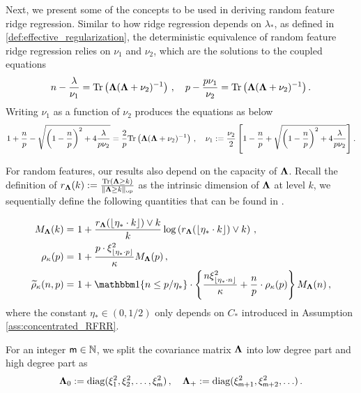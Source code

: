 Next, we present some of the concepts to be used in deriving random feature ridge regression. Similar to how ridge regression depends on \(\lambda_*\), as defined in \cref{def:effective_regularization}, the deterministic equivalence of random feature ridge regression relies on \(\nu_1\) and \(\nu_2\), which are the solutions to the coupled equations
\begin{equation}\label{eq:fixed_points_appendix}
    n - \frac{\lambda}{\nu_1} = {\rm Tr}\left( {\boldsymbol \Lambda} ( {\boldsymbol \Lambda} + \nu_2)^{-1} \right)\,, \quad p - \frac{p\nu_1}{\nu_2} = {\rm Tr} \left( {\boldsymbol \Lambda} ( {\boldsymbol \Lambda} + \nu_2 )^{-1} \right).
\end{equation}
Writing $\nu_1$ as a function of $\nu_2$ produces the equations as below
\begin{equation}\label{eq:def:nu}
    1 + \frac{n}{p} - \sqrt{\left(1 - \frac{n}{p}\right)^2 + 4\frac{\lambda}{p\nu_2}}  = \frac{2}{p} {\rm Tr} \left( {\boldsymbol \Lambda} ( {\boldsymbol \Lambda} + \nu_2 )^{-1} \right)\,, \quad \nu_1 := \frac{\nu_2}{2} \left[ 1 - \frac{n}{p} + \sqrt{\left(1 - \frac{n}{p}\right)^2 + 4\frac{\lambda}{p\nu_2}} \right].
\end{equation} 



For random features, our results also depend on the capacity of ${\boldsymbol \Lambda}$. Recall the definition of \(r_{\boldsymbol \Lambda}(k) := \frac{{\rm Tr}({\boldsymbol \Lambda}{\geq k})}{\| {\boldsymbol \Lambda}{\geq k} \|_{\rm op}}\) as the intrinsic dimension of \({\boldsymbol \Lambda}\) at level \(k\), we sequentially define the following quantities that can be found in \citet{misiakiewicz2024non,defilippis2024dimension}.

\begin{align}
    M_\bLambda (k) =&~ 1 + \frac{r_{\bLambda} (\lfloor \eta_* \cdot k \rfloor) \vee k}{k} \log \left( r_{\bLambda} (\lfloor \eta_* \cdot k \rfloor) \vee k \right)\,,\\
    \rho_\kappa (p) =&~ 1 + \frac{p \cdot \xi^2_{\lfloor \eta_* \cdot p \rfloor}}{\kappa}  M_\bLambda (p)\,, \label{eq:def_rho_p}
    \\
    \trho_\kappa (n,p) =&~ 1 + \ind \{ n \leq p/\eta_*\} \cdot \left\{ \frac{n \xi_{\lfloor \eta_* \cdot n \rfloor}^2}{\kappa} + \frac{n}{p} \cdot \rho_\kappa (p)\right\} M_\bLambda (n)\,, \label{eq:def_trho_n_p}
\end{align}
where the constant \(\eta_* \in (0,1/2)\) only depends on \(C_*\) introduced in Assumption \ref{ass:concentrated_RFRR}. 


For an integer ${\mathsf m} \in {\mathbb N}$, we split the covariance matrix ${\boldsymbol \Lambda}$ into low degree part and high degree part as
\[
{\boldsymbol \Lambda}_0 := {\rm diag} (\xi_1^2, \xi_2^2 , \ldots , \xi_{{\mathsf m}}^2)\,, \quad {\boldsymbol \Lambda}_+ := {\rm diag} (\xi_{{\mathsf m}+1}^2, \xi_{{\mathsf m}+2}^2 , \ldots )\,.
\]

